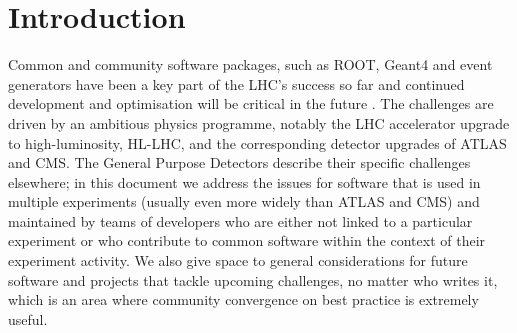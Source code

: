 
\hypertarget{introduction}{%
\section{Introduction}\label{introduction}}

Common and community software packages, such as ROOT, Geant4 and event
generators have been a key part of the LHC's success so far and
continued development and optimisation will be critical in the future
\cite{stewart_graeme_a_2018_2413005, Ellis:2691414, Albrecht2019}. The
challenges are driven by an ambitious physics programme, notably the LHC
accelerator upgrade to high-luminosity, HL-LHC, and the corresponding
detector upgrades of ATLAS and CMS. The General Purpose Detectors
describe their specific challenges elsewhere; in this document we
address the issues for software that is used in multiple experiments
(usually even more widely than ATLAS and CMS) and maintained by teams of
developers who are either not linked to a particular experiment or who
contribute to common software within the context of their experiment
activity. We also give space to general considerations for future
software and projects that tackle upcoming challenges, no matter who
writes it, which is an area where community convergence on best practice
is extremely useful.

